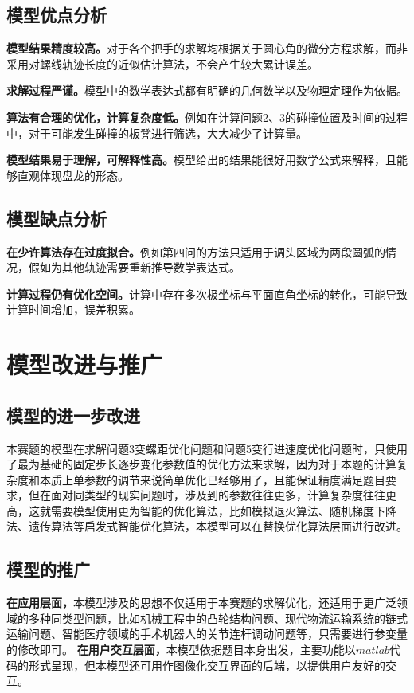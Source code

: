 \documentclass[withoutpreface,bwprint]{cumcmthesis} %
\begin{document}
\subsection{模型优点分析}
\noindent\textbf{模型结果精度较高。}对于各个把手的求解均根据关于圆心角的微分方程求解，而非采用对螺线轨迹长度的近似估计算法，不会产生较大累计误差。

\noindent\textbf{求解过程严谨。}模型中的数学表达式都有明确的几何数学以及物理定理作为依据。

\noindent\textbf{算法有合理的优化，计算复杂度低。}例如在计算问题2、3的碰撞位置及时间的过程中，对于可能发生碰撞的板凳进行筛选，大大减少了计算量。

\noindent\textbf{模型结果易于理解，可解释性高。}模型给出的结果能很好用数学公式来解释，且能够直观体现盘龙的形态。
\subsection{模型缺点分析}
\noindent\textbf{在少许算法存在过度拟合。}例如第四问的方法只适用于调头区域为两段圆弧的情况，假如为其他轨迹需要重新推导数学表达式。

\noindent\textbf{计算过程仍有优化空间。}计算中存在多次极坐标与平面直角坐标的转化，可能导致计算时间增加，误差积累。
\section{模型改进与推广}
\subsection{模型的进一步改进}
本赛题的模型在求解问题3变螺距优化问题和问题5变行进速度优化问题时，只使用了最为基础的固定步长逐步变化参数值的优化方法来求解，因为对于本题的计算复杂度和本质上单参数的调节来说简单优化已经够用了，且能保证精度满足题目要求，但在面对同类型的现实问题时，涉及到的参数往往更多，计算复杂度往往更高，这就需要模型使用更为智能的优化算法，比如模拟退火算法、随机梯度下降法、遗传算法等启发式智能优化算法，本模型可以在替换优化算法层面进行改进。
\subsection{模型的推广}
\textbf{在应用层面，}本模型涉及的思想不仅适用于本赛题的求解优化，还适用于更广泛领域的多种同类型问题，比如机械工程中的凸轮结构问题、现代物流运输系统的链式运输问题、智能医疗领域的手术机器人的关节连杆调动问题等，只需要进行参变量的修改即可。
\textbf{在用户交互层面，}本模型依据题目本身出发，主要功能以$matlab$代码的形式呈现，但本模型还可用作图像化交互界面的后端，以提供用户友好的交互。
\end{document}
